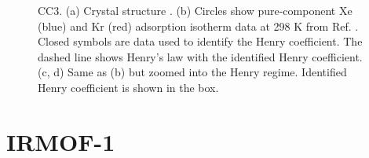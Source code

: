     \begin{figure}[h!]
       \centering
  
       
       \caption{CC3. (a) Crystal structure \cite{CC3_structure}.
       (b) Circles show pure-component Xe (blue) and Kr (red) adsorption isotherm data at 298 K from Ref. \cite{CC3_XeKr}. 
       Closed symbols are data used to identify the Henry coefficient. The dashed line shows Henry's law with the identified Henry coefficient.
       (c, d) Same as (b) but zoomed into the Henry regime. Identified Henry coefficient is shown in the box.}
    \end{figure}
    
    \clearpage
    
    
    \section{IRMOF-1}
    

